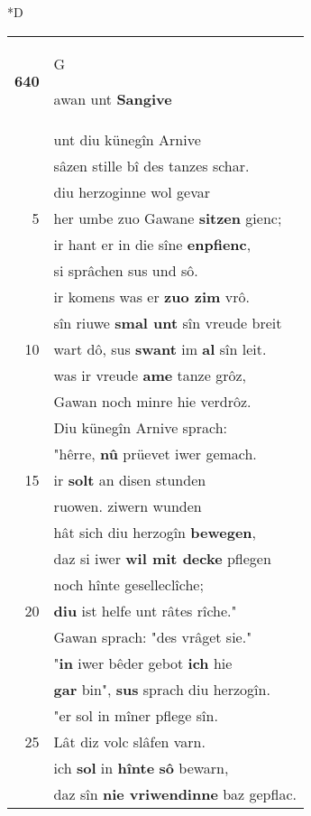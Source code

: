 \documentclass[8pt,a4paper,notitlepage]{article}
\begin{document}
\begin{table}[ht]
\begin{minipage}[t]{0.5\linewidth}
\small
\begin{center}*D
\end{center}
\begin{tabular}{rl}
\textbf{640} & \begin{large}G\end{large}awan unt \textbf{Sangive}\\ 
 & unt diu künegîn Arnive\\ 
 & sâzen stille bî des tanzes schar.\\ 
 & diu herzoginne wol gevar\\ 
5 & her umbe zuo Gawane \textbf{sitzen} gienc;\\ 
 & ir hant er in die sîne \textbf{enpfienc},\\ 
 & si sprâchen sus und sô.\\ 
 & ir komens was er \textbf{zuo zim} vrô.\\ 
 & sîn riuwe \textbf{smal unt} sîn vreude breit\\ 
10 & wart dô, sus \textbf{swant} im \textbf{al} sîn leit.\\ 
 & was ir vreude \textbf{ame} tanze grôz,\\ 
 & Gawan noch minre hie verdrôz.\\ 
 & Diu künegîn Arnive sprach:\\ 
 & "hêrre, \textbf{nû} prüevet iwer gemach.\\ 
15 & ir \textbf{solt} an disen stunden\\ 
 & ruowen. ziwern wunden\\ 
 & hât sich diu herzogîn \textbf{bewegen},\\ 
 & daz si iwer \textbf{wil mit decke} pflegen\\ 
 & noch hînte geselleclîche;\\ 
20 & \textbf{diu} ist helfe unt râtes rîche."\\ 
 & Gawan sprach: "des vrâget sie."\\ 
 & "\textbf{in} iwer bêder gebot \textbf{ich} hie\\ 
 & \textbf{gar} bin", \textbf{sus} sprach diu herzogîn.\\ 
 & "er sol in mîner pflege sîn.\\ 
25 & Lât diz volc slâfen varn.\\ 
 & ich \textbf{sol} in \textbf{hînte} \textbf{sô} bewarn,\\ 
 & daz sîn \textbf{nie vriwendinne} baz gepflac.\\ 

\end{tabular}
\end{minipage}
\end{table}
\end{document}
